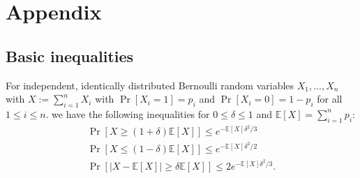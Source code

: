 \chapter{Appendix}
\section{Basic inequalities}
\begin{lemma}
For independent, identically distributed Bernoulli random variables $X_1, \dots, X_n$ with $X := \sum_{i=1}^n X_i$
with $\Pr[X_i = 1] = p_i$ and $\Pr[X_i = 0] = 1 - p_i$ for all $ 1 \leq  i \leq n$.
we have the following inequalities for $0 \leq \delta \leq 1$ and $\mathbb{E}[X] = \sum_{i=1}^{n} p_i$:
\begin{gather}
\label{ineq:ch0}
\Pr[X \geq (1+\delta) \mathbb{E}[X]] \leq e^{- \mathbb{E}[X] \delta^2/3} \\
\label{ineq:ch1}
\Pr[X \leq (1-\delta) \mathbb{E}[X]] \leq e^{- \mathbb{E}[X] \delta^2/2} \\
\label{ineq:ch2}
\Pr[|X - \mathbb{E}[X]| \geq \delta \mathbb{E}[X]] \leq 2 e^{- \mathbb{E}[X] \delta^2 / 3}.
\end{gather}
\end{lemma}